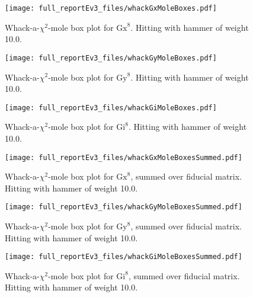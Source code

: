 {\begin{figure}
\begin{center}
\texttt{[image: full\_reportEv3\_files/whackGxMoleBoxes.pdf]}
\caption{Whack-a-$\chi^2$-mole box plot for $\mathrm{Gx}^{8}$.  Hitting with hammer of weight 10.0.\label{WhackGxMoleBoxPlot}}
\end{center}
\end{figure}

\begin{figure}
\begin{center}
\texttt{[image: full\_reportEv3\_files/whackGyMoleBoxes.pdf]}
\caption{Whack-a-$\chi^2$-mole box plot for $\mathrm{Gy}^{8}$.  Hitting with hammer of weight 10.0.\label{WhackGyMoleBoxPlot}}
\end{center}
\end{figure}

\begin{figure}
\begin{center}
\texttt{[image: full\_reportEv3\_files/whackGiMoleBoxes.pdf]}
\caption{Whack-a-$\chi^2$-mole box plot for $\mathrm{Gi}^{8}$.  Hitting with hammer of weight 10.0.\label{WhackGiMoleBoxPlot}}
\end{center}
\end{figure}

\begin{figure}
\begin{center}
\texttt{[image: full\_reportEv3\_files/whackGxMoleBoxesSummed.pdf]}
\caption{Whack-a-$\chi^2$-mole box plot for $\mathrm{Gx}^{8}$, summed over fiducial matrix.  Hitting with hammer of weight 10.0.\label{WhackGxMoleBoxPlotSummed}}
\end{center}
\end{figure}

\begin{figure}
\begin{center}
\texttt{[image: full\_reportEv3\_files/whackGyMoleBoxesSummed.pdf]}
\caption{Whack-a-$\chi^2$-mole box plot for $\mathrm{Gy}^{8}$, summed over fiducial matrix.  Hitting with hammer of weight 10.0.\label{WhackGyMoleBoxPlotSummed}}
\end{center}
\end{figure}

\begin{figure}
\begin{center}
\texttt{[image: full\_reportEv3\_files/whackGiMoleBoxesSummed.pdf]}
\caption{Whack-a-$\chi^2$-mole box plot for $\mathrm{Gi}^{8}$, summed over fiducial matrix.  Hitting with hammer of weight 10.0.\label{WhackGiMoleBoxPlotSummed}}
\end{center}
\end{figure}

}{}
